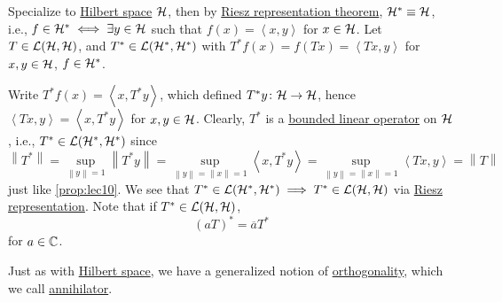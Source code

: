 \begin{remark}
	Specialize to \hyperref[def:Hilbert-space]{Hilbert space} \(\mathcal{\MakeUppercase{h}} \), then by \hyperref[thm:Riesz-representation]{Riesz representation theorem}, \(\mathcal{\MakeUppercase{h}} ^{\ast} \equiv \mathcal{\MakeUppercase{h}} \), i.e., \(f\in \mathcal{\MakeUppercase{h}} ^{\ast} \iff \exists y\in \mathcal{\MakeUppercase{h}} \) such that \(f(x) = \left\langle x, y \right\rangle \) for \(x\in \mathcal{\MakeUppercase{h}} \). Let \(T\in \mathcal{\MakeUppercase{l}} (\mathcal{\MakeUppercase{h}} , \mathcal{\MakeUppercase{h}} )\), and \(T^{\ast} \in \mathcal{\MakeUppercase{l}} (\mathcal{\MakeUppercase{h}} ^{\ast} , \mathcal{\MakeUppercase{h}} ^{\ast} )\) with \(T^{\ast} f(x) = f(Tx) = \left\langle Tx, y \right\rangle\) for \(x, y\in \mathcal{\MakeUppercase{h}} \), \(f\in \mathcal{\MakeUppercase{h}} ^{\ast} \).

	Write \(T^{\ast} f(x) = \left\langle x, T^{\ast} y \right\rangle \), which defined \(T^{\ast} y\colon \mathcal{\MakeUppercase{H}} \to \mathcal{\MakeUppercase{h}} \), hence \(\left\langle Tx, y \right\rangle = \left\langle x, T^{\ast} y \right\rangle  \) for \(x, y\in \mathcal{\MakeUppercase{h}}\). Clearly, \(T^{\ast} \) is a \hyperref[def:bounded-linear-op]{bounded linear operator} on \(\mathcal{\MakeUppercase{h}} \), i.e., \(T^{\ast} \in \mathcal{\MakeUppercase{l}} (\mathcal{\MakeUppercase{h}}^{\ast} , \mathcal{\MakeUppercase{h}}^{\ast} )\) since
	\[
		\left\lVert T^{\ast} \right\rVert
		= \sup _{\left\lVert y\right\rVert = 1} \left\lVert T^{\ast} y\right\rVert
		= \sup _{\left\lVert y\right\rVert = \left\lVert x\right\rVert = 1} \left\langle x, T^{\ast} y \right\rangle
		= \sup _{\left\lVert y\right\rVert = \left\lVert x\right\rVert = 1}\left\langle Tx, y \right\rangle
		= \left\lVert T\right\rVert
	\]
	just like \autoref{prop:lec10}. We see that \(T^{\ast} \in \mathcal{\MakeUppercase{l}} (\mathcal{\MakeUppercase{h}} ^{\ast} , \mathcal{\MakeUppercase{h}} ^{\ast} )\implies T^{\ast} \in \mathcal{\MakeUppercase{l}} (\mathcal{\MakeUppercase{h}} , \mathcal{\MakeUppercase{h}} )\) via \hyperref[thm:Riesz-representation]{Riesz representation}. Note that if \(T^{\ast} \in \mathcal{\MakeUppercase{l}} (\mathcal{\MakeUppercase{h}} , \mathcal{\MakeUppercase{h}} )\),
	\[
		(aT)^{\ast} = \overline{a} T^{\ast}
	\]
	for \(a\in \mathbb{\MakeUppercase{c}} \).
\end{remark}

Just as with \hyperref[def:Hilbert-space]{Hilbert space}, we have a generalized notion of \hyperref[def:orthogonal]{orthogonality}, which we call \hyperref[def:annihilator]{annihilator}.

